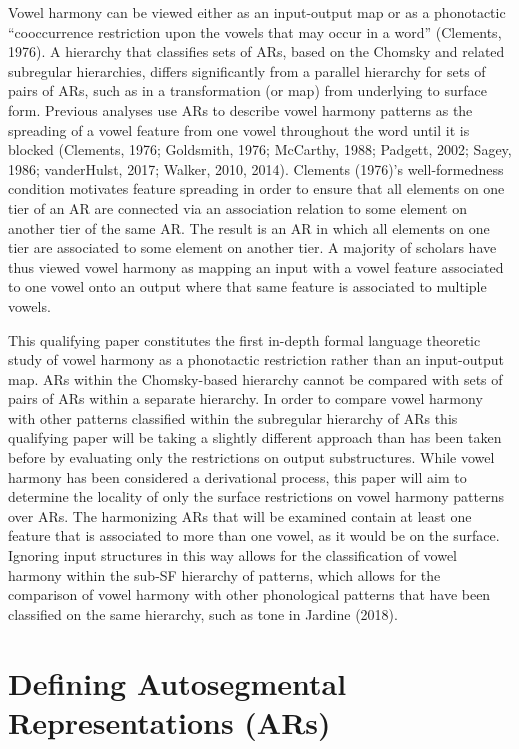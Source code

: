 \documentclass[,doc,floatsintext]{apa6}
\theoremstyle{definition}
\theoremstyle{definition}
\theoremstyle{definition}
\theoremstyle{remark}
\begin{document}
Vowel harmony can be viewed either as an input-output map or as a
phonotactic \enquote{cooccurrence restriction upon the vowels that may
occur in a word} (Clements, 1976). A hierarchy that classifies sets of
ARs, based on the Chomsky and related subregular hierarchies, differs
significantly from a parallel hierarchy for sets of pairs of ARs, such
as in a transformation (or map) from underlying to surface form.
Previous analyses use ARs to describe vowel harmony patterns as the
spreading of a vowel feature from one vowel throughout the word until it
is blocked (Clements, 1976; Goldsmith, 1976; McCarthy, 1988; Padgett,
2002; Sagey, 1986; vanderHulst, 2017; Walker, 2010, 2014). Clements
(1976)'s well-formedness condition motivates feature spreading in order
to ensure that all elements on one tier of an AR are connected via an
association relation to some element on another tier of the same AR. The
result is an AR in which all elements on one tier are associated to some
element on another tier. A majority of scholars have thus viewed vowel
harmony as mapping an input with a vowel feature associated to one vowel
onto an output where that same feature is associated to multiple vowels.

This qualifying paper constitutes the first in-depth formal language
theoretic study of vowel harmony as a phonotactic restriction rather
than an input-output map. ARs within the Chomsky-based hierarchy cannot
be compared with sets of pairs of ARs within a separate hierarchy. In
order to compare vowel harmony with other patterns classified within the
subregular hierarchy of ARs this qualifying paper will be taking a
slightly different approach than has been taken before by evaluating
only the restrictions on output substructures. While vowel harmony has
been considered a derivational process, this paper will aim to determine
the locality of only the surface restrictions on vowel harmony patterns
over ARs. The harmonizing ARs that will be examined contain at least one
feature that is associated to more than one vowel, as it would be on the
surface. Ignoring input structures in this way allows for the
classification of vowel harmony within the sub-SF hierarchy of patterns,
which allows for the comparison of vowel harmony with other phonological
patterns that have been classified on the same hierarchy, such as tone
in Jardine (2018).

\section{Defining Autosegmental Representations
(ARs)}\label{defining-autosegmental-representations-ars}
\end{document}
